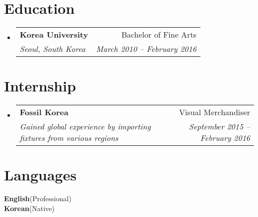 \documentclass[letterpaper,10pt]{article}
\makeatletter
\newcommand{\resumeSubheading}[4]{
  \vspace{-2pt}\item
    \begin{tabular*}{0.97\textwidth}[t]{l@{\extracolsep{\fill}}r}
      \textbf{#1} & #2 \\
      \textit{\small#3} & \textit{\small #4} \\
    \end{tabular*}\vspace{-7pt}
}
\newcommand{\resumeSubHeadingListStart}{\begin{itemize}[leftmargin=0.1in, label={}]}
\newcommand{\resumeSubHeadingListEnd}{\end{itemize}\vspace{2pt}}
\makeatother
\begin{document}
\section{Education}
    \resumeSubHeadingListStart
        \resumeSubheading
          {Korea University}{Bachelor of Fine Arts}
          {Seoul, South Korea}{March 2010 -- February 2016}
        \resumeSubHeadingListEnd
        

\section{Internship}
    \resumeSubHeadingListStart
        \resumeSubheading
          {Fossil Korea}{Visual Merchandiser}
          {Gained global experience by importing fixtures from various regions}{September 2015 -- February 2016}
        \resumeSubHeadingListEnd

\section{Languages}
 \begin{itemize}[leftmargin=0.1in, label={}]
    \small{\item{
     \textbf{English}{(Professional)}\\
     \textbf{Korean}{(Native)}
    }}
 \end{itemize}

\end{document}
